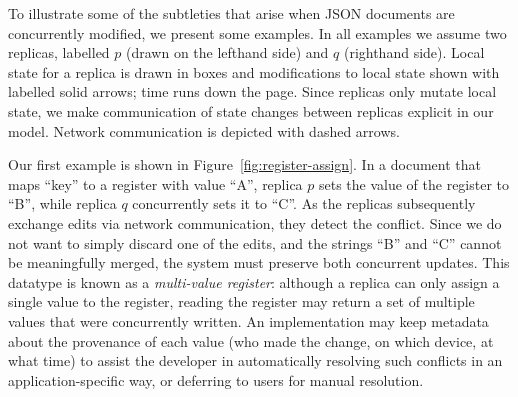 \documentclass[10pt,journal,compsoc]{IEEEtran}
\begin{document}
\begin{figure*}
\centering
{}
\caption{Concurrent assignment to the register at doc[``key''] by replicas $p$ and $q$.}\label{fig:register-assign}
\end{figure*}

To illustrate some of the subtleties that arise when JSON documents are concurrently modified, we present some examples. In all examples we assume two replicas, labelled $p$ (drawn on the lefthand side) and $q$ (righthand side). Local state for a replica is drawn in boxes and modifications to local state shown with labelled solid arrows; time runs down the page. Since replicas only mutate local state, we make communication of state changes between replicas explicit in our model. Network communication is depicted with dashed arrows.

Our first example is shown in Figure~\ref{fig:register-assign}. In a document that maps ``key'' to a register with value ``A'', replica $p$ sets the value of the register to ``B'', while replica $q$ concurrently sets it to ``C''. As the replicas subsequently exchange edits via network communication, they detect the conflict. Since we do not want to simply discard one of the edits, and the strings ``B'' and ``C'' cannot be meaningfully merged, the system must preserve both concurrent updates. This datatype is known as a \emph{multi-value register}: although a replica can only assign a single value to the register, reading the register may return a set of multiple values that were concurrently written. An implementation may keep metadata about the provenance of each value (who made the change, on which device, at what time) to assist the developer in automatically resolving such conflicts in an application-specific way, or deferring to users for manual resolution.
\end{document}
